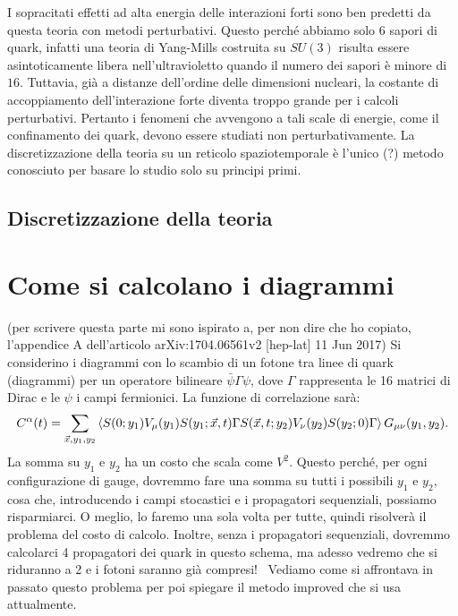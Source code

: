 \documentclass[LaM]{sapthesis}
\begin{document}
	I sopracitati effetti ad alta energia delle interazioni forti sono ben predetti da questa teoria con metodi perturbativi. Questo perché abbiamo solo $6$ sapori di quark, infatti una teoria di Yang-Mills costruita su $SU(3)$ risulta essere asintoticamente libera nell'ultravioletto quando il numero dei sapori è minore di $16$. Tuttavia, già a distanze dell'ordine delle dimensioni nucleari, la costante di accoppiamento dell'interazione forte diventa troppo grande per i calcoli perturbativi. Pertanto i fenomeni che avvengono a tali scale di energie, come il confinamento dei quark, devono essere studiati non perturbativamente. La discretizzazione della teoria su un reticolo spaziotemporale è l'unico \color{red}(?)\color{black} metodo conosciuto per basare lo studio solo su principi primi.
	\section{Discretizzazione della teoria}
	
	
	\chapter{Come si calcolano i diagrammi}
	\color{green}(per scrivere questa parte mi sono ispirato a, per non dire che ho copiato, l'appendice A dell'articolo arXiv:1704.06561v2 [hep-lat] 11 Jun 2017)\color{black} Si considerino i diagrammi con lo scambio di un fotone tra linee di quark \color{blue}(diagrammi)\color{black} per un operatore bilineare $\bar{\psi}\Gamma\psi$, dove $\Gamma$ rappresenta le 16 matrici di Dirac e le $\psi$ i campi fermionici. La funzione di correlazione sarà:
	\begin{equation}
		C^\alpha(t)=\sum_{\vec{x},y_1,y_2}\braket{S(0;y_1)V_\mu(y_1)S(y_1;\vec{x},t)\Gamma S(\vec{x},t;y_2)V_\nu(y_2)S(y_2;0)\Gamma}G_{\mu\nu}(y_1,y_2).
	\end{equation}
	La somma su $y_1$ e $y_2$ ha un costo che scala come $V^2$. \color{red}Questo perché, per ogni configurazione di gauge, dovremmo fare una somma su tutti i possibili $y_1$ e $y_2$, cosa che, introducendo i campi stocastici e i propagatori sequenziali, possiamo risparmiarci. O meglio, lo faremo una sola volta per tutte, quindi risolverà il problema del costo di calcolo. Inoltre, senza i propagatori sequenziali, dovremmo calcolarci 4 propagatori dei quark in questo schema, ma adesso vedremo che si riduranno a 2 e i fotoni saranno già compresi!\color{black} \ Vediamo come si affrontava in passato questo problema per poi spiegare il metodo improved che si usa attualmente.
	
\end{document}
